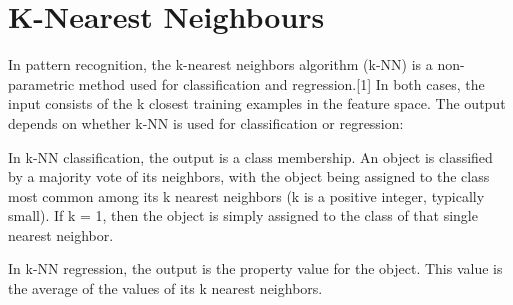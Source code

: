 \documentclass[paper=a4, fontsize=11pt]{scrartcl}
\numberwithin{equation}{section}		%
\numberwithin{figure}{section}			%
\numberwithin{table}{section}				%
\begin{document}
\section{K-Nearest Neighbours}

In pattern recognition, the k-nearest neighbors algorithm (k-NN) is a non-parametric method used for classification and regression.[1] In both cases, the input consists of the k closest training examples in the feature space. The output depends on whether k-NN is used for classification or regression:

In k-NN classification, the output is a class membership. An object is classified by a majority vote of its neighbors, with the object being assigned to the class most common among its k nearest neighbors (k is a positive integer, typically small). If k = 1, then the object is simply assigned to the class of that single nearest neighbor.

In k-NN regression, the output is the property value for the object. This value is the average of the values of its k nearest neighbors.

\end{document}
